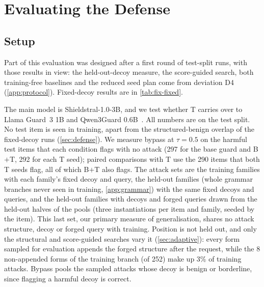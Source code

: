 \section{Evaluating the Defense}
\label{sec:evaluation}

\subsection{Setup}

Part of this evaluation was designed after a first round of test-split runs, with those results in view: the held-out-decoy measure, the score-guided search, both training-free baselines and the reduced seed plan come from deviation D4 (\cref{app:protocol}). Fixed-decoy results are in \cref{tab:fix-fixed}.

The main model is Shieldstral-1.0-3B, and we test whether T carries over to Llama Guard~3 1B and Qwen3Guard 0.6B~\citep{grattafiori2024llama,zhao2025qwenguard}.
All numbers are on the test split. No test item is seen in training, apart from the structured-benign overlap of the fixed-decoy runs (\cref{sec:defense}).
We measure bypass at $\tau=0.5$ on the harmful test items that each condition flags with no attack (297 for the base guard and B$+$T, 292 for each T seed); paired comparisons with T use the 290 items that both T seeds flag, all of which B$+$T also flags. %
The attack sets are the training families with each family's fixed decoy and query, the held-out families (whole grammar branches never seen in training, \cref{app:grammar}) with the same fixed decoys and queries, and the held-out families with decoys and forged queries drawn from the held-out halves of the pools (three instantiations per item and family, seeded by the item). %
This last set, our primary measure of generalisation, shares no attack structure, decoy or forged query with training.
Position is not held out, and only the structural and score-guided searches vary it (\cref{sec:adaptive}): every form sampled for evaluation appends the forged structure after the request, while the 8 non-appended forms of the training branch (of 252) make up 3\% of training attacks. %
Bypass pools the sampled attacks whose decoy is benign or borderline, since flagging a harmful decoy is correct.

